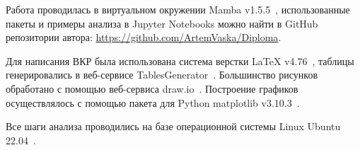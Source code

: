 Работа проводилась в виртуальном окружении Mamba v1.5.5~\cite{mamba}, использованные пакеты и примеры анализа в Jupyter Notebooks можно найти в GitHub~\cite{github_general} репозитории автора: \url{https://github.com/ArtemVaska/Diploma}.

Для написания ВКР была использована система верстки LaTeX v4.76~\cite{latex}, таблицы генерировались в веб-сервисе TablesGenerator~\cite{tablesgenerator}.
Большинство рисунков обработано с помощью веб-сервиса draw.io~\cite{drawio}.
Построение графиков осуществлялось с помощью пакета для Python matplotlib v3.10.3~\cite{Hunter2007}.

Все шаги анализа проводились на базе операционной системы Linux Ubuntu 22.04~\cite{ubuntu}.
